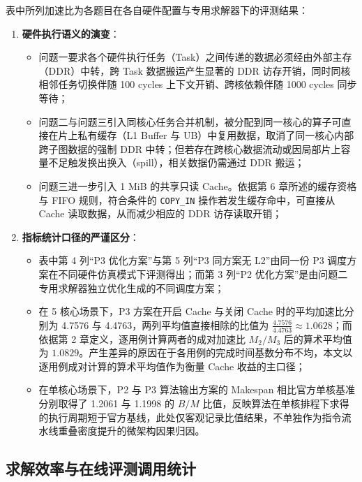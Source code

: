 \documentclass[anonymous,notoc]{gmcm2026}
\providecommand{\tightlist}{\setlength{\itemsep}{0pt}\setlength{\parskip}{0pt}}
\begin{document}
表中所列加速比为各题目在各自硬件配置与专用求解器下的评测结果：

\begin{enumerate}
\def\labelenumi{\arabic{enumi}.}
\tightlist
\item
  \textbf{硬件执行语义的演变}：

  \begin{itemize}
  \tightlist
  \item
    问题一要求各个硬件执行任务（Task）之间传递的数据必须经由外部主存（DDR）中转，跨 Task 数据搬运产生显著的 DDR 访存开销，同时同核相邻任务切换伴随 100 cycles 上下文开销、跨核依赖伴随 1000 cycles 同步等待；
  \item
    问题二与问题三引入同核心任务合并机制，被分配到同一核心的算子可直接在片上私有缓存（L1 Buffer 与 UB）中复用数据，取消了同一核心内部跨子图数据的强制 DDR 中转；但若存在跨核心数据流动或因局部片上容量不足触发换出换入（spill），相关数据仍需通过 DDR 搬运；
  \item
    问题三进一步引入 1 MiB 的共享只读 Cache。依据第 6 章所述的缓存资格与 FIFO 规则，符合条件的 \texttt{COPY\_IN} 操作若发生缓存命中，可直接从 Cache 读取数据，从而减少相应的 DDR 访存读取开销；
  \end{itemize}
\item
  \textbf{指标统计口径的严谨区分}：

  \begin{itemize}
  \tightlist
  \item
    表中第 4 列``P3 优化方案''与第 5 列``P3 同方案无 L2''由同一份 P3 调度方案在不同硬件仿真模式下评测得出；而第 3 列``P2 优化方案''是由问题二专用求解器独立优化生成的不同调度方案；
  \item
    在 5 核心场景下，P3 方案在开启 Cache 与关闭 Cache 时的平均加速比分别为 4.7576 与 4.4763，两列平均值直接相除的比值为 \(\frac{4.7576}{4.4763} \approx 1.0628\)；而依据第 2 章定义，逐用例计算两者的成对加速比 \(M_2/M_3\) 后的算术平均值为 \(1.0829\)。产生差异的原因在于各用例的完成时间基数分布不均，本文以逐用例成对计算的算术平均值作为衡量 Cache 收益的主口径；
  \item
    在单核心场景下，P2 与 P3 算法输出方案的 Makespan 相比官方单核基准分别取得了 1.2061 与 1.1998 的 \(B/M\) 比值，反映算法在单核排程下求得的执行周期短于官方基线，此处仅客观记录比值结果，不单独作为指令流水线重叠密度提升的微架构因果归因。
  \end{itemize}
\end{enumerate}

\subsection{求解效率与在线评测调用统计}
\end{document}
